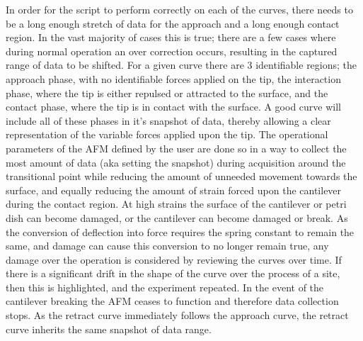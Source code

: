 In order for the script to perform correctly on each of the curves, there needs to be a long enough stretch of data for the approach and a long enough contact region. In the vast majority of cases this is true; there are a few cases where during normal operation an over correction occurs, resulting in the captured range of data to be shifted. For a given curve there are 3 identifiable regions; the approach phase, with no identifiable forces applied on the tip, the interaction phase, where the tip is either repulsed or attracted to the surface, and the contact phase, where the tip is in contact with the surface. A good curve will include all of these phases in it's snapshot of data, thereby allowing a clear representation of the variable forces applied upon the tip. The operational parameters of the AFM defined by the user are done so in a way to collect the most amount of data (aka setting the snapshot) during acquisition around the transitional point while reducing the amount of unneeded movement towards the surface, and equally reducing the amount of strain forced upon the cantilever during the contact region. At high strains the surface of the cantilever or petri dish can become damaged, or the cantilever can become damaged or break. As the conversion of deflection into force requires the spring constant to remain the same, and damage can cause this conversion to no longer remain true, any damage over the operation is considered by reviewing the curves over time. If there is a significant drift in the shape of the curve over the process of a site, then this is highlighted, and the experiment repeated. In the event of the cantilever breaking the AFM ceases to function and therefore data collection stops. As the retract curve immediately follows the approach curve, the retract curve inherits the same snapshot of data range.%







